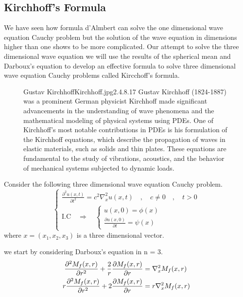 \documentclass[]{article}
\begin{document}
\subsection{Kirchhoff's Formula}
We have seen how formula d'Almbert can solve the one dimensional wave equation Cauchy problem but the solution of the wave equation in dimensions higher than one shows to be more complicated. 
Our attempt to solve the three dimensional wave equation 
we will use the results of the spherical mean and Darboux's equation to develop an effective formula to solve three dimensional wave equation Cauchy problems called Kircchoff's formula.
\par
\begin{figure}[b]
    \begin{enrichment}{Gustav Kirchhoff}{Kirchhoff.jpg}{2.4}{.8}{.17}
        Gustav Kirchhoff (1824-1887) was a prominent German physicist
        Kirchhoff made significant advancements in the understanding of wave phenomena and the mathematical modeling of physical systems using PDEs.
        One of Kirchhoff's most notable contributions in PDEs is his formulation of the Kirchhoff equations, which describe the propagation of waves in elastic materials, such as solids and thin plates. These equations are fundamental to the study of vibrations, acoustics, and the behavior of mechanical systems subjected to dynamic loads.
    \end{enrichment}    
\end{figure}
Consider the following three dimensional wave equation Cauchy problem.
\begin{equation}
    \begin{cases}
        \displaystyle \frac{\partial^2 u(x,t)}{\partial t^2} = c^2 \nabla_{x}^{2}u(x,t) \quad,\quad c\neq 0 \quad,\quad t > 0
        \\
        \text{I.C} \quad \Longrightarrow \quad 
        \begin{cases}
            u\left(x,0 \right) = \phi\left(x\right)
            \\
            \displaystyle \frac{\partial u\left(x,0 \right)}{\partial t} = \psi\left(x\right)
        \end{cases} 
    \end{cases}
\end{equation}
where $x = (x_1,x_2,x_3)$ is a three dimensional vector.
\par
we start by considering Darboux's equation in n = 3.
\begin{align}
\frac{\partial^2 M_f (x,r)}{\partial r^2} + \frac{2}{r} \frac{\partial M_f (x,r)}{\partial r} &= \nabla_{x}^{2} M_f (x,r) \notag
\\ 
r\frac{\partial^2 M_f (x,r)}{\partial r^2} + 2 \frac{\partial M_f (x,r)}{\partial r} &= r\nabla_{x}^{2} M_f (x,r)
\end{align}
\end{document}
